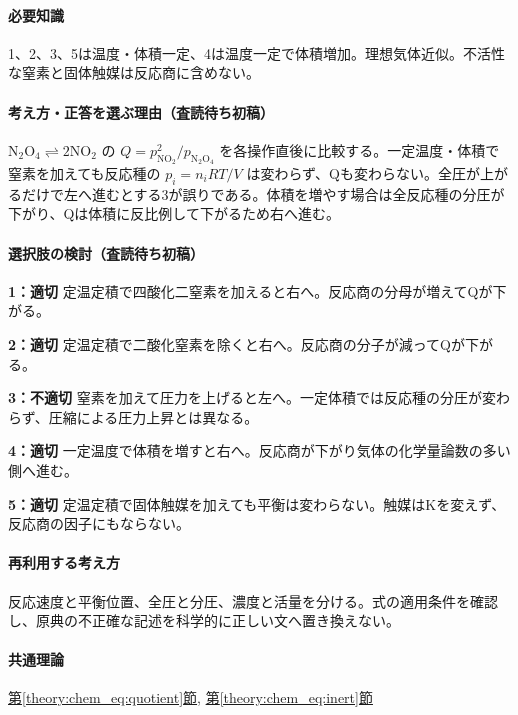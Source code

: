 \paragraph{必要知識} 1、2、3、5は温度・体積一定、4は温度一定で体積増加。理想気体近似。不活性な窒素と固体触媒は反応商に含めない。

\paragraph{考え方・正答を選ぶ理由（査読待ち初稿）} \(\mathrm{N_2O_4\rightleftharpoons2NO_2}\) の \(Q=p_{\mathrm{NO_2}}^2/p_{\mathrm{N_2O_4}}\) を各操作直後に比較する。一定温度・体積で窒素を加えても反応種の \(p_i=n_iRT/V\) は変わらず、Qも変わらない。全圧が上がるだけで左へ進むとする3が誤りである。体積を増やす場合は全反応種の分圧が下がり、Qは体積に反比例して下がるため右へ進む。

\paragraph{選択肢の検討（査読待ち初稿）}\mbox{}\par

\noindent\textbf{1：適切} 定温定積で四酸化二窒素を加えると右へ。反応商の分母が増えてQが下がる。\par

\noindent\textbf{2：適切} 定温定積で二酸化窒素を除くと右へ。反応商の分子が減ってQが下がる。\par

\noindent\textbf{3：不適切} 窒素を加えて圧力を上げると左へ。一定体積では反応種の分圧が変わらず、圧縮による圧力上昇とは異なる。\par

\noindent\textbf{4：適切} 一定温度で体積を増すと右へ。反応商が下がり気体の化学量論数の多い側へ進む。\par

\noindent\textbf{5：適切} 定温定積で固体触媒を加えても平衡は変わらない。触媒はKを変えず、反応商の因子にもならない。\par

\paragraph{再利用する考え方} 反応速度と平衡位置、全圧と分圧、濃度と活量を分ける。式の適用条件を確認し、原典の不正確な記述を科学的に正しい文へ置き換えない。

\paragraph{共通理論} \hyperref[theory:chem_eq:quotient]{第\ref*{theory:chem_eq:quotient}節}, \hyperref[theory:chem_eq:inert]{第\ref*{theory:chem_eq:inert}節}

